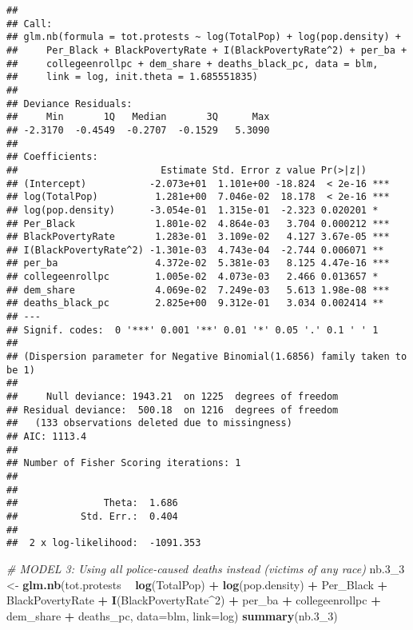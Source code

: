 \documentclass[
]{article}
\newenvironment{Shaded}{\begin{snugshade}}{\end{snugshade}}
\newcommand{\CommentTok}[1]{\textcolor[rgb]{0.56,0.35,0.01}{\textit{#1}}}
\newcommand{\DataTypeTok}[1]{\textcolor[rgb]{0.13,0.29,0.53}{#1}}
\newcommand{\DecValTok}[1]{\textcolor[rgb]{0.00,0.00,0.81}{#1}}
\newcommand{\FloatTok}[1]{\textcolor[rgb]{0.00,0.00,0.81}{#1}}
\newcommand{\KeywordTok}[1]{\textcolor[rgb]{0.13,0.29,0.53}{\textbf{#1}}}
\newcommand{\NormalTok}[1]{#1}
\newcommand{\OperatorTok}[1]{\textcolor[rgb]{0.81,0.36,0.00}{\textbf{#1}}}
\newcommand{\StringTok}[1]{\textcolor[rgb]{0.31,0.60,0.02}{#1}}
\begin{document}
\begin{verbatim}
## 
## Call:
## glm.nb(formula = tot.protests ~ log(TotalPop) + log(pop.density) + 
##     Per_Black + BlackPovertyRate + I(BlackPovertyRate^2) + per_ba + 
##     collegeenrollpc + dem_share + deaths_black_pc, data = blm, 
##     link = log, init.theta = 1.685551835)
## 
## Deviance Residuals: 
##     Min       1Q   Median       3Q      Max  
## -2.3170  -0.4549  -0.2707  -0.1529   5.3090  
## 
## Coefficients:
##                         Estimate Std. Error z value Pr(>|z|)    
## (Intercept)           -2.073e+01  1.101e+00 -18.824  < 2e-16 ***
## log(TotalPop)          1.281e+00  7.046e-02  18.178  < 2e-16 ***
## log(pop.density)      -3.054e-01  1.315e-01  -2.323 0.020201 *  
## Per_Black              1.801e-02  4.864e-03   3.704 0.000212 ***
## BlackPovertyRate       1.283e-01  3.109e-02   4.127 3.67e-05 ***
## I(BlackPovertyRate^2) -1.301e-03  4.743e-04  -2.744 0.006071 ** 
## per_ba                 4.372e-02  5.381e-03   8.125 4.47e-16 ***
## collegeenrollpc        1.005e-02  4.073e-03   2.466 0.013657 *  
## dem_share              4.069e-02  7.249e-03   5.613 1.98e-08 ***
## deaths_black_pc        2.825e+00  9.312e-01   3.034 0.002414 ** 
## ---
## Signif. codes:  0 '***' 0.001 '**' 0.01 '*' 0.05 '.' 0.1 ' ' 1
## 
## (Dispersion parameter for Negative Binomial(1.6856) family taken to be 1)
## 
##     Null deviance: 1943.21  on 1225  degrees of freedom
## Residual deviance:  500.18  on 1216  degrees of freedom
##   (133 observations deleted due to missingness)
## AIC: 1113.4
## 
## Number of Fisher Scoring iterations: 1
## 
## 
##               Theta:  1.686 
##           Std. Err.:  0.404 
## 
##  2 x log-likelihood:  -1091.353
\end{verbatim}

\begin{Shaded}
\begin{Highlighting}[]
\CommentTok{# MODEL 3: Using all police-caused deaths instead (victims of any race)}
\NormalTok{nb}\FloatTok{.3}\NormalTok{_}\DecValTok{3}\NormalTok{ <-}\StringTok{ }\KeywordTok{glm.nb}\NormalTok{(tot.protests }\OperatorTok{~}\StringTok{ }\KeywordTok{log}\NormalTok{(TotalPop) }\OperatorTok{+}\StringTok{ }\KeywordTok{log}\NormalTok{(pop.density) }\OperatorTok{+}\StringTok{ }\NormalTok{Per_Black }\OperatorTok{+}\StringTok{ }\NormalTok{BlackPovertyRate }\OperatorTok{+}\StringTok{ }\KeywordTok{I}\NormalTok{(BlackPovertyRate}\OperatorTok{^}\DecValTok{2}\NormalTok{) }\OperatorTok{+}\StringTok{ }\NormalTok{per_ba }\OperatorTok{+}\StringTok{ }\NormalTok{collegeenrollpc }\OperatorTok{+}\StringTok{ }\NormalTok{dem_share }\OperatorTok{+}\StringTok{ }\NormalTok{deaths_pc, }\DataTypeTok{data=}\NormalTok{blm, }\DataTypeTok{link=}\NormalTok{log)}
\KeywordTok{summary}\NormalTok{(nb}\FloatTok{.3}\NormalTok{_}\DecValTok{3}\NormalTok{) }
\end{Highlighting}
\end{Shaded}
\end{document}
